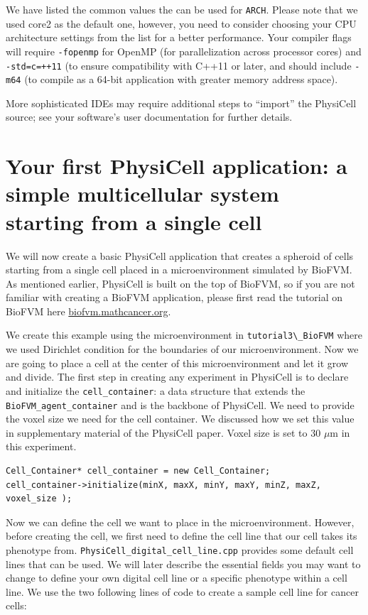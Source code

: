 \documentclass[11pt]{article}
\newcommand{\micron}{\mu\textrm{m}}
\begin{document}
We have listed the common values the can be used for \verb:ARCH:. Please note that we used core2 as the default
one, however, you need to consider choosing your CPU architecture settings from the list for a better performance.
Your compiler flags will require \verb:-fopenmp: for OpenMP (for parallelization
across processor cores) and \verb:-std=c=++11: (to ensure compatibility with C++11 or
later, and should include \verb:-m64: (to compile
as a 64-bit application with greater memory address space).

More sophisticated IDEs may require additional steps to ``import'' the PhysiCell source; see
your software's user documentation for further details.

\section{Your first PhysiCell application:  a simple multicellular system starting from a single cell}
\label{first_example}
We will now create a basic PhysiCell application that creates a spheroid of cells starting from a single cell
placed in a microenvironment simulated by BioFVM. As mentioned earlier, PhysiCell is built on the top of BioFVM,
so if you are not familiar with creating a BioFVM application, please first read the tutorial on BioFVM here
\url{biofvm.mathcancer.org}.

We create this example using the microenvironment in \verb:tutorial3\_BioFVM: where we
used Dirichlet condition for the boundaries of our microenvironment. Now we are going to place a cell at the center
of this microenvironment and let it grow and divide. The first step in creating any experiment in PhysiCell is to declare
and initialize the \verb:cell_container:: a data structure that extends the \verb:BioFVM_agent_container: and is the backbone of
PhysiCell. We need to provide the voxel size we need for the cell container. We discussed how we set this value in supplementary
material of the PhysiCell paper. Voxel size is set to 30 $\micron$ in this experiment.

\begin{verbatim}
Cell_Container* cell_container = new Cell_Container;
cell_container->initialize(minX, maxX, minY, maxY, minZ, maxZ, voxel_size );
\end{verbatim}

Now we can define the cell we want to place in the microenvironment. However, before creating the cell, we first need to define the cell line
that our cell takes its phenotype from. \verb:PhysiCell_digital_cell_line.cpp: provides some default cell lines that can be
used. We will later describe the essential fields you may want to change to define your own digital cell
line or a specific phenotype within a cell line. We use the two following lines of code to create a sample cell line for
cancer cells:
\end{document}
